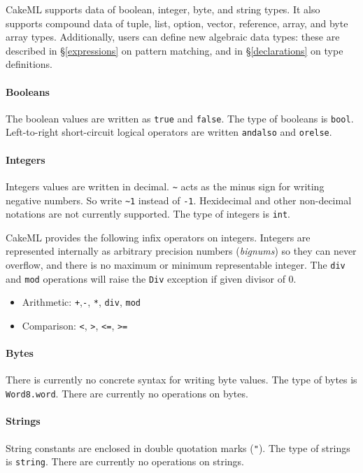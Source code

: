 \documentclass[12pt,a4paper]{book}
\begin{document}
CakeML supports data of boolean, integer, byte, and string types. It also supports compound data of tuple, list, option, vector, reference, array, and byte array types. Additionally, users can define new algebraic data types: these are described in  \S\ref{expressions} on pattern matching, and in \S\ref{declarations} on type definitions.

\paragraph{Booleans} The boolean values are written as \texttt{true} and \texttt{false}. The type of booleans is \texttt{bool}. Left-to-right short-circuit logical operators are written \texttt{andalso} and \texttt{orelse}.

\paragraph{Integers} Integers values are written in decimal. \verb|~| acts as the minus sign for writing negative numbers. So write \verb|~1| instead of \verb|-1|. Hexidecimal and other non-decimal notations are not currently supported. The type of integers is \texttt{int}.

CakeML provides the following infix operators on integers. Integers are represented internally as arbitrary precision numbers (\emph{bignums}) so they can never overflow, and there is no maximum or minimum representable integer. The \texttt{div} and \texttt{mod} operations will raise the \texttt{Div} exception if given divisor of 0.
\begin{itemize}
\item Arithmetic: \texttt{+},\texttt{-}, \texttt{*}, \texttt{div}, \texttt{mod}
\item Comparison: \texttt{<}, \texttt{>}, \texttt{<=}, \texttt{>=}
\end{itemize}

\paragraph{Bytes} There is currently no concrete syntax for writing byte values. The type of bytes is \texttt{Word8.word}. There are currently no operations on bytes.

\paragraph{Strings} String constants are enclosed in double quotation marks (\texttt{"}). The type of strings is \texttt{string}. There are currently no operations on strings.
\end{document}
